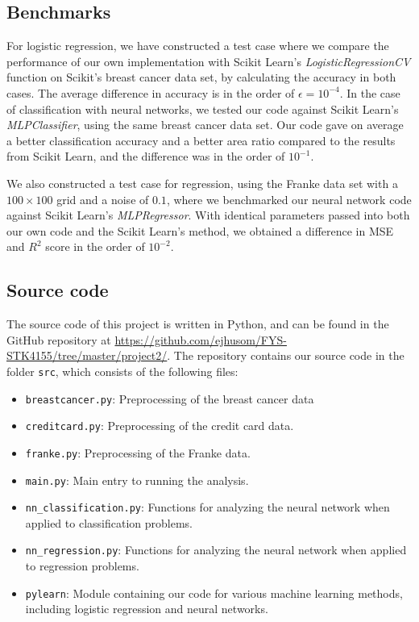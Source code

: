 \subsection{Benchmarks}
For logistic regression, we have constructed a test case where we compare the performance of our own implementation with Scikit Learn's \textit{LogisticRegressionCV} function on Scikit's breast cancer data set, by calculating the accuracy in both cases. The average difference in accuracy is in the order of $\epsilon = 10^{-4}$. In the case of classification with neural networks, we tested our code against Scikit Learn's \textit{MLPClassifier}, using the same breast cancer data set. Our code gave on average a better classification accuracy and a better area ratio compared to the results from Scikit Learn, and the difference was in the order of $10^{-1}$.

We also constructed a test case for regression, using the Franke data set with a $100 \times 100$ grid and a noise of $0.1$, where we benchmarked our neural network code against Scikit Learn's \textit{MLPRegressor}. With identical parameters passed into both our own code and the Scikit Learn's method, we obtained a difference in MSE and $R^2$ score in the order of $10^{-2}$.


\subsection{Source code}

The source code of this project is written in Python, and can be found in the GitHub repository at \url{https://github.com/ejhusom/FYS-STK4155/tree/master/project2/}. The repository contains our source code in the folder \texttt{src}, which consists of the following files:

\begin{itemize}
    \item \texttt{breastcancer.py}: Preprocessing of the breast cancer data
    \item \texttt{creditcard.py}: Preprocessing of the credit card data.
    \item \texttt{franke.py}: Preprocessing of the Franke data.
    \item \texttt{main.py}: Main entry to running the analysis.
    \item \texttt{nn\_classification.py}: Functions for analyzing the neural network when applied to classification problems.
    \item \texttt{nn\_regression.py}: Functions for analyzing the neural network when applied to regression problems.
    \item \texttt{pylearn}: Module containing our code for various machine learning methods, including logistic regression and neural networks.
\end{itemize}


